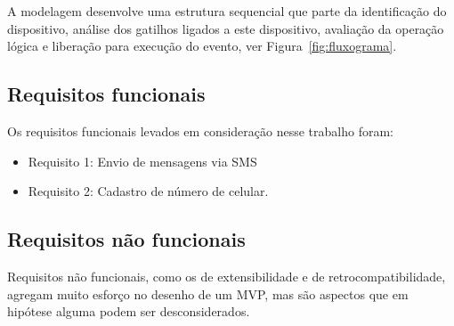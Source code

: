 A modelagem desenvolve uma estrutura sequencial que parte da identificação do dispositivo, análise dos gatilhos ligados a este dispositivo, avaliação da operação lógica e liberação para execução do evento, ver Figura~\ref{fig:fluxograma}.  

\subsection{Requisitos funcionais}
\label{reqFuncionais}

Os requisitos funcionais levados em consideração nesse trabalho foram:

\begin{itemize}
	\item Requisito 1: Envio de mensagens via SMS \cite{SMS}
	
	\item Requisito 2: Cadastro de número de celular.
\end{itemize}

\subsection{Requisitos não funcionais}
\label{reqNaoFuncionais}

Requisitos não funcionais, como os de extensibilidade e de retrocompatibilidade, agregam muito esforço no desenho de um MVP, mas são aspectos que em hipótese alguma podem ser desconsiderados.
